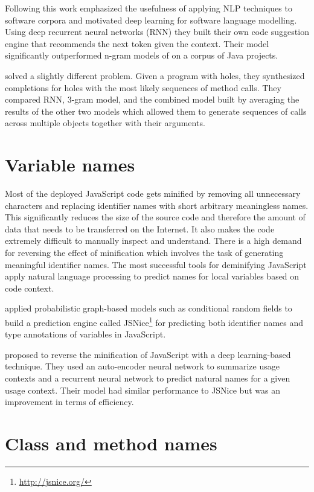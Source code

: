Following this work \cite{Whit15} emphasized the usefulness of applying NLP techniques to software corpora and motivated deep learning for software language modelling. Using deep recurrent neural networks (RNN) they built their own code suggestion engine that recommends the next token given the context. Their model significantly outperformed n-gram models of \cite{Hind12} on a corpus of Java projects.

\cite{Rayc14} solved a slightly different problem. Given a program with holes, they synthesized completions for holes with the most likely sequences of method calls.
They compared RNN, 3-gram model, and the combined model built by averaging the results of the other two models which allowed them to generate sequences of calls across multiple objects together with their arguments.

\section{Variable names}

Most of the deployed JavaScript code gets minified by removing all unnecessary characters and replacing identifier names with short arbitrary meaningless names. This significantly reduces the size of the source code and therefore the amount of data that needs to be transferred on the Internet. It also makes the code extremely difficult to manually inspect and understand. There is a high demand for reversing the effect of minification which involves the task of generating meaningful identifier names. The most successful tools for deminifying JavaScript apply natural language processing to predict names for local variables based on code context.

\cite{Rayc15} applied probabilistic graph-based models such as conditional random fields to build a prediction engine called JSNice\footnote{\url{http://jsnice.org/}} for predicting both identifier names and type annotations of variables in JavaScript.

\cite{Bavi18} proposed to reverse the minification of JavaScript with a deep learning-based technique. They used an auto-encoder neural network to summarize usage contexts and a recurrent neural network to predict natural names for a given usage context. Their model had similar performance to JSNice but was an improvement in terms of efficiency.

\section{Class and method names}

